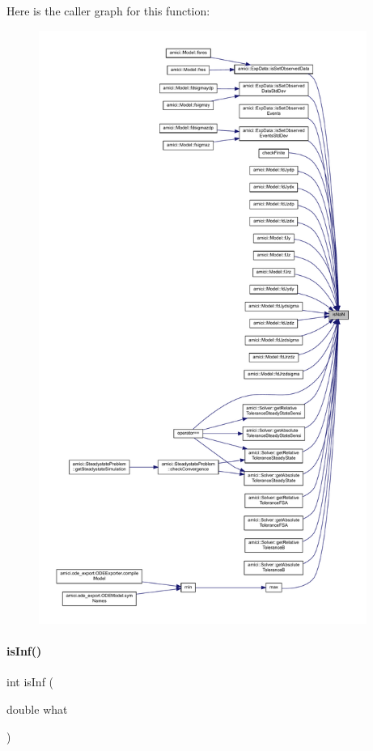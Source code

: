 Here is the caller graph for this function\+:
\nopagebreak
\begin{figure}[H]
\begin{center}
\leavevmode
\includegraphics[height=550pt]{namespaceamici_a7452657cd5f8d541f9e823df5e82c516_icgraph}
\end{center}
\end{figure}
\mbox{\label{namespaceamici_a10c0a2eb43575a155a34f5bb280f7973}} 
\paragraph{\texorpdfstring{isInf()}{isInf()}}
{\footnotesize\ttfamily int is\+Inf (\begin{DoxyParamCaption}\item[{double}]{what }\end{DoxyParamCaption})}

